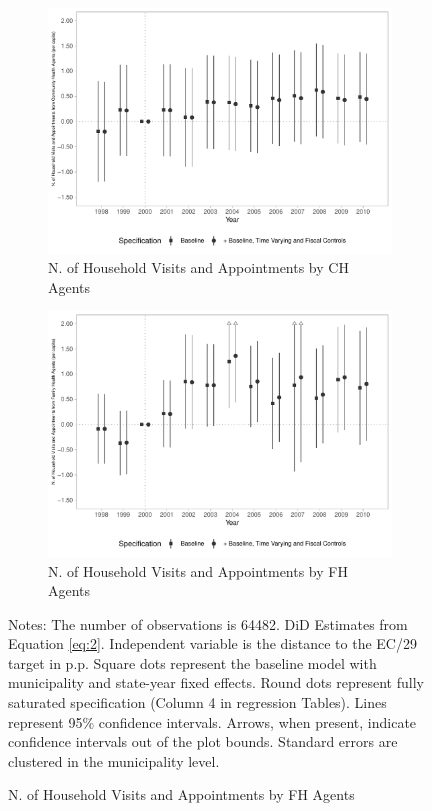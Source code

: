 \begin{figure}[h!]
\begin{center}
\begin{subfigure}{0.32\textwidth}
        \centering
        \caption{\scriptsize N. of Household Visits and Appointments by CH Agents}\label{fig:9e}
        \includegraphics[width=\textwidth]{plots/siab_visit_cons_pacs_pcapita_dist_ec29_baseline_dist_ec29_baseline_9.pdf}
    \end{subfigure}
    \begin{subfigure}{0.32\textwidth}
        \centering
        \caption{\scriptsize N. of Household Visits and Appointments by FH Agents}\label{fig:9f}
        \includegraphics[width=\textwidth]{plots/siab_visit_cons_psf_pcapita_dist_ec29_baseline_dist_ec29_baseline_9.pdf}
    \end{subfigure}
    
    \end{center}
    
            \scriptsize{Notes: The number of observations is 64482. DiD Estimates from Equation \ref{eq:2}. Independent variable is the distance to the EC/29 target in p.p. Square dots represent the baseline model with municipality and state-year fixed effects. Round dots represent fully saturated specification (Column 4 in regression Tables). Lines represent 95\% confidence intervals. Arrows, when present, indicate confidence intervals out of the plot bounds. Standard errors are clustered in the municipality level.}
    
\end{figure}